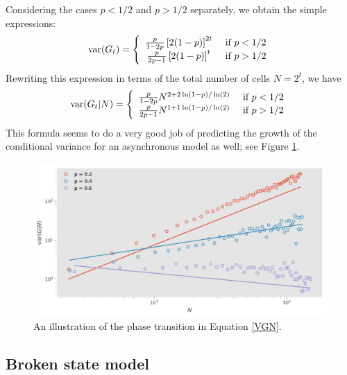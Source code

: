 \documentclass{article}
\begin{document}
Considering the cases $p<1/2$ and $p>1/2$ separately, we obtain the simple expressions:  
\begin{equation}
{\rm var}(G_t) = \left\{\begin{array}{cc} 
\frac{p}{1-2p} \left[2(1-p)\right]^{2t}& \text{ if } p<1/2\\
\frac{p}{2p-1} \left[2(1-p)\right]^{t}& \text{ if } p>1/2
\end{array}\right.
\end{equation}
Rewriting this expression in terms of the total number of cells $N = 2^t$, we have
\begin{equation}\label{VGN}
{\rm var}(G_t|N) = \left\{\begin{array}{cc} 
\frac{p}{1-2p} N^{2 + 2 \ln(1-p)/\ln(2)}& \text{ if } p<1/2\\
\frac{p}{2p-1} N^{1+ 1 \ln(1-p)/\ln(2)}& \text{ if } p>1/2
\end{array}\right.
\end{equation}
This formula seems to do a very good job of predicting the growth of the conditional variance for an asynchronous model as well; see Figure \ref{fig:S1}. 


\begin{figure}[h!]
\centering
\includegraphics[scale=0.6]{figS1.pdf}
\caption{An illustration of the phase transition in Equation \ref{VGN}. }\label{fig:S1}
\end{figure}



\subsection{Broken state model}
\end{document}
